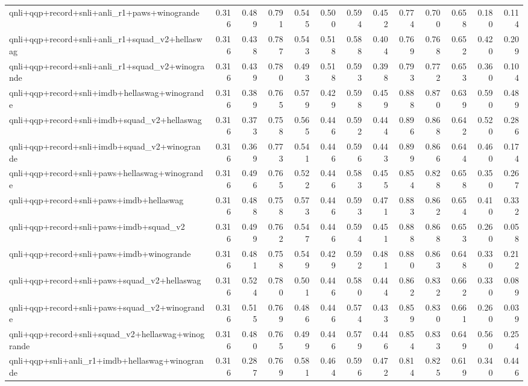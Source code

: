 \begin{table}[t]
\begin{tabular}{lrrrrrrrrrrrr}
    qnli+qqp+record+snli+anli\_r1+paws+winogrande & 0.316 & 0.489 & 0.791 & 0.545 & 0.500 & 0.594 & 0.452 & 0.774 & 0.700 & 0.658 & 0.180 & 0.114 \\
    qnli+qqp+record+snli+anli\_r1+squad\_v2+hellaswag & 0.316 & 0.438 & 0.787 & 0.543 & 0.518 & 0.588 & 0.404 & 0.769 & 0.768 & 0.652 & 0.420 & 0.209 \\
    qnli+qqp+record+snli+anli\_r1+squad\_v2+winogrande & 0.316 & 0.439 & 0.780 & 0.493 & 0.518 & 0.593 & 0.398 & 0.793 & 0.772 & 0.653 & 0.360 & 0.104 \\
    qnli+qqp+record+snli+imdb+hellaswag+winogrande & 0.316 & 0.389 & 0.765 & 0.579 & 0.429 & 0.598 & 0.459 & 0.888 & 0.870 & 0.639 & 0.590 & 0.489 \\
    qnli+qqp+record+snli+imdb+squad\_v2+hellaswag & 0.316 & 0.373 & 0.758 & 0.565 & 0.446 & 0.592 & 0.444 & 0.896 & 0.868 & 0.642 & 0.520 & 0.286 \\
    qnli+qqp+record+snli+imdb+squad\_v2+winogrande & 0.316 & 0.369 & 0.773 & 0.541 & 0.446 & 0.596 & 0.443 & 0.899 & 0.866 & 0.644 & 0.460 & 0.174 \\
    qnli+qqp+record+snli+paws+hellaswag+winogrande & 0.316 & 0.496 & 0.765 & 0.522 & 0.446 & 0.583 & 0.455 & 0.854 & 0.828 & 0.658 & 0.350 & 0.267 \\
    qnli+qqp+record+snli+paws+imdb+hellaswag & 0.316 & 0.488 & 0.758 & 0.573 & 0.446 & 0.593 & 0.471 & 0.883 & 0.862 & 0.654 & 0.410 & 0.332 \\
    qnli+qqp+record+snli+paws+imdb+squad\_v2 & 0.316 & 0.499 & 0.762 & 0.547 & 0.446 & 0.594 & 0.451 & 0.888 & 0.868 & 0.653 & 0.260 & 0.058 \\
    qnli+qqp+record+snli+paws+imdb+winogrande & 0.316 & 0.481 & 0.758 & 0.549 & 0.429 & 0.592 & 0.481 & 0.880 & 0.863 & 0.648 & 0.330 & 0.212 \\
    qnli+qqp+record+snli+paws+squad\_v2+hellaswag & 0.316 & 0.524 & 0.780 & 0.501 & 0.446 & 0.580 & 0.444 & 0.862 & 0.832 & 0.662 & 0.330 & 0.089 \\
    qnli+qqp+record+snli+paws+squad\_v2+winogrande & 0.316 & 0.515 & 0.769 & 0.486 & 0.446 & 0.574 & 0.433 & 0.859 & 0.830 & 0.661 & 0.260 & 0.039 \\
    qnli+qqp+record+snli+squad\_v2+hellaswag+winogrande & 0.316 & 0.480 & 0.765 & 0.499 & 0.446 & 0.579 & 0.446 & 0.854 & 0.833 & 0.649 & 0.560 & 0.254 \\
    qnli+qqp+snli+anli\_r1+imdb+hellaswag+winogrande & 0.316 & 0.287 & 0.769 & 0.581 & 0.464 & 0.596 & 0.472 & 0.814 & 0.825 & 0.619 & 0.340 & 0.446 \\

\end{tabular}
\end{table}
